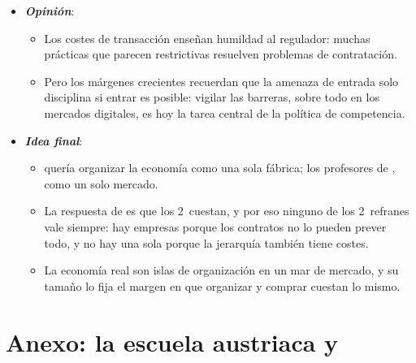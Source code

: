 \documentclass[11pt]{article}
\begin{document}
\begin{itemize}
\begin{itemize}
  \item las cadenas globales de valor como decisión de hacer o comprar entre países ;
  \item y las plataformas digitales, en las que los efectos de red y los datos son las nuevas barreras y que la Unión Europea regula desde 2022 con un reglamento «sobre mercados disputables y equitativos en el sector digital»\nocite{UE2022DMA} (anexo~\ref{anexo:plataformas}).
  \end{itemize}
\item \textbf{\emph{Opinión}}:
  \begin{itemize}
  \item Los costes de transacción enseñan humildad al regulador: muchas prácticas que parecen restrictivas resuelven problemas de contratación.
  \item Pero los márgenes crecientes recuerdan que la amenaza de entrada solo disciplina si entrar es posible: vigilar las barreras, sobre todo en los mercados digitales, es hoy la tarea central de la política de competencia.
  \end{itemize}
\item \textbf{\emph{Idea final}}:
  \begin{itemize}
  \item {} quería organizar la economía como una sola fábrica; los profesores de , como un solo mercado.

  \item La respuesta de  es que los 2~cuestan, y por eso ninguno de los 2~refranes vale siempre: hay empresas porque los contratos no lo pueden prever todo, y no hay una sola porque la jerarquía también tiene costes.

  \item La economía real son islas de organización en un mar de mercado, y su tamaño lo fija el margen en que organizar y comprar cuestan lo mismo.
  \end{itemize}
\end{itemize}

\clearpage
\appendix

\section{Anexo: la escuela austriaca y }\label{anexo:austriaca}
\end{document}
